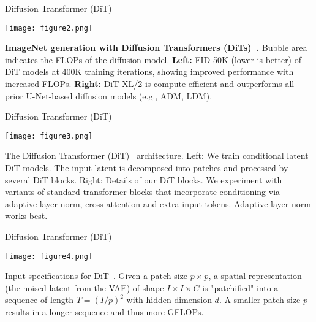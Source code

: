 \begin{refsection}
\begin{frame}{Diffusion Transformer (DiT)}

  \centering
  \texttt{[image: figure2.png]}
  
  \vspace{0.7em}
  {\scriptsize
    \textbf{ImageNet generation with Diffusion Transformers (DiTs)~\parencite{Peebles_2023_ICCV}.} Bubble area indicates the FLOPs of the diffusion model.
    \textbf{Left:} FID-50K (lower is better) of DiT models at 400K training iterations, showing improved performance with increased FLOPs.
    \textbf{Right:} DiT-XL/2 is compute-efficient and outperforms all prior U-Net-based diffusion models (e.g., ADM, LDM).
  }


\bottomleftrefs
\end{frame}
\end{refsection}

\begin{refsection}
  \begin{frame}{Diffusion Transformer (DiT)}
  
    \centering
    \texttt{[image: figure3.png]}
    
    {\scriptsize
    The Diffusion Transformer (DiT)~\parencite{Peebles_2023_ICCV} architecture. Left: We train conditional latent DiT models. The input latent is decomposed into patches and processed by several DiT blocks. Right: Details of our DiT blocks. We experiment with variants of standard transformer blocks that incorporate conditioning via adaptive layer norm, cross-attention and extra input tokens. Adaptive layer norm works best.
    }
  
  
  \bottomleftrefs
  \end{frame}
  \end{refsection}

  \begin{refsection}
    \begin{frame}{Diffusion Transformer (DiT)}
    
      \centering
      \texttt{[image: figure4.png]}
      
      {\scriptsize
      Input specifications for DiT~\parencite{Peebles_2023_ICCV}. Given a patch size \( p \times p \), a spatial representation (the noised latent from the VAE) of shape \( I \times I \times C \) is "patchified" into a sequence of length \( T = (I/p)^2 \) with hidden dimension \( d \). A smaller patch size \( p \) results in a longer sequence and thus more GFLOPs.
      }
    
    \bottomleftrefs
    \end{frame}
    \end{refsection}
  

